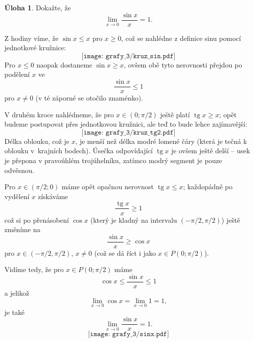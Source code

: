 \documentclass[12pt,a4paper]{article}
\DeclareMathOperator{\tg}{tg}
\theoremstyle{definition}
\newtheorem{uloha}{Úloha}
\newenvironment{res}{\proof}{\endproof}
\begin{document}
\begin{uloha}
Dokažte, že
\[ \lim_{x \to 0} \frac{\sin x}{x} = 1. \]
\end{uloha}
\begin{res}
Z hodiny víme, že $\sin x \leq x$ pro $x \geq 0$, což se nahlédne z definice sinu pomocí jednotkové kružnice:
\[ \texttt{[image: grafy\_3/kruz\_sin.pdf]} \]
Pro $x \leq 0$ naopak dostaneme $\sin x \geq x$, ovšem obě tyto nerovnosti přejdou po podělení $x$ ve
\[ \frac{\sin x}{x} \leq 1 \]
pro $x \neq 0$ (v té záporné se otočilo znaménko).

V druhém kroce nahlédneme, že pro $x \in (0; \pi/2)$ ještě platí $\tg x \geq x$; opět budeme postupovat přes jednotkovou kružnici, ale teď to bude lehce zajímavější:
\[ \texttt{[image: grafy\_3/kruz\_tg2.pdf]} \]
Délka oblouku, což je $x$, je menší než délka modré lomené čáry (která je tečná k oblouku v~krajních bodech). Úsečka odpovídající $\tg x$ je ovšem ještě delší --  usek je přepona v pravoúhlém trojúhelníku, zatímco modrý segment je pouze odvěsnou.

Pro $x \in (\pi/2; 0)$ máme opět opačnou nerovnost $\tg x \leq x$; každopádně po vydělení $x$ získáváme
\[ \frac{\tg x}{x} \geq 1 \]
což si po přenásobení $\cos x$ (který je kladný na intervalu $(-\pi/2, \pi/2)$) ještě změníme na
\[ \frac{\sin x}{x} \geq \cos x \]
pro $x \in (-\pi/2, \pi/2)$, $x \neq 0$ (což se dá říct i jako $x \in P(0; \pi/2)$).

Vidíme tedy, že pro $x \in P(0; \pi/2)$ máme
\[ \cos x \leq \frac{\sin x}{x} \leq 1 \]
a jelikož
\[ \lim_{x \to 0} \cos x = \lim_{x \to 0} 1 = 1, \]
je také
\[ \lim_{x \to 0} \frac{\sin x}{x} = 1. \]
\[ \texttt{[image: grafy\_3/sinx.pdf]} \]
\end{res}
\end{document}
